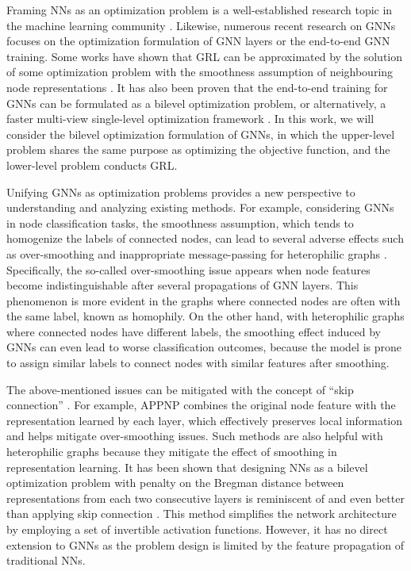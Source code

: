 \documentclass{article}
\begin{document}
Framing NNs as an optimization problem is a well-established research topic in the machine learning community \cite{frecon2022bregman, yang2021robust, louati2021deep}. Likewise, numerous recent research on GNNs focuses on the optimization formulation of GNN layers or the end-to-end GNN training. Some works have shown that GRL can be approximated by the solution of some optimization problem with the smoothness assumption of neighbouring node representations \cite{zhu2021interpreting, ma2021unified, yang2021attributes}. It has also been proven that the end-to-end training for GNNs can be formulated as a bilevel optimization problem, or alternatively, a faster multi-view single-level optimization framework \cite{han2023alternately}. In this work, we will consider the bilevel optimization formulation of GNNs, in which the upper-level problem shares the same purpose as optimizing the objective function, and the lower-level problem conducts GRL.

Unifying GNNs as optimization problems provides a new perspective to understanding and analyzing existing methods. For example, considering GNNs in node classification tasks, the smoothness assumption, which tends to homogenize the labels of connected nodes, can lead to several adverse effects such as over-smoothing and inappropriate message-passing for heterophilic graphs \cite{yang2021attributes, yan2022two}. 
Specifically, the so-called over-smoothing issue appears when node features become indistinguishable after several propagations of GNN layers. This phenomenon is more evident in the graphs where connected nodes are often with the same label, known as homophily. 
On the other hand, with heterophilic graphs where connected nodes have different labels, the smoothing effect induced by GNNs can even lead to worse classification outcomes, because the model is prone to assign similar labels to connect nodes with similar features after smoothing.



The above-mentioned issues can be mitigated with the concept of ``skip connection'' \cite{he2016resnethu}. For example, APPNP \cite{KlicperaBG19} combines the original node feature with the representation learned by each layer, which effectively preserves local information and helps mitigate over-smoothing issues. Such methods are also helpful with heterophilic graphs because they mitigate the effect of smoothing in representation learning. It has been shown that designing NNs as a bilevel optimization problem with penalty on the Bregman distance between representations from each two consecutive layers is reminiscent of and even better than applying skip connection \cite{frecon2022bregman, dhillon2008matrix}. This method simplifies the network architecture by employing a set of invertible activation functions. However, it has no direct extension to GNNs as the problem design is limited by the feature propagation of traditional NNs.
\end{document}
